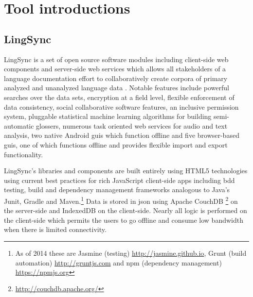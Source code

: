 \documentclass[11pt]{article}
\begin{document}
\section{Tool introductions}


\subsection{LingSync}\label{sec:lingsync}

LingSync is a set of open source software modules including client-side web
components and  server-side web services which allows all stakeholders of a language documentation effort to
collaboratively create corpora of primary analyzed and unanalyzed language data
\cite{lingsync:2012}. Notable features include powerful searches over the data
sets, encryption at a field level, flexible enforcement of data consistency, social collaborative software features, an
inclusive permission system, pluggable statistical machine learning algorithms for building
semi-automatic glossers, numerous task oriented web services for audio and text analysis, two native Android \glspl{gui} which function offline and five browser-based \glspl{gui},
one of which functions offline and provides flexible import and export functionality. 


LingSync's libraries and components are built entirely using HTML5 technologies using current best practices for rich JavaScript client-side apps including \gls{bdd} testing, build and dependency management frameworks analogous to Java's Junit, Gradle and Maven.\footnote{As of 2014 these are Jasmine (testing) \url{http://jasmine.github.io}, Grunt (build automation) \url{http://gruntjs.com} and \gls{npm} (dependency management) \url{https://npmjs.org}}
Data is stored in \gls{json} using Apache CouchDB%
\footnote{\url{http://couchdb.apache.org/}} %
on the server-side and IndexedDB on the client-side.  Nearly all logic is performed on the client-side which permits the users to go offline and consume low bandwidth when there is limited connectivity.
\end{document}

